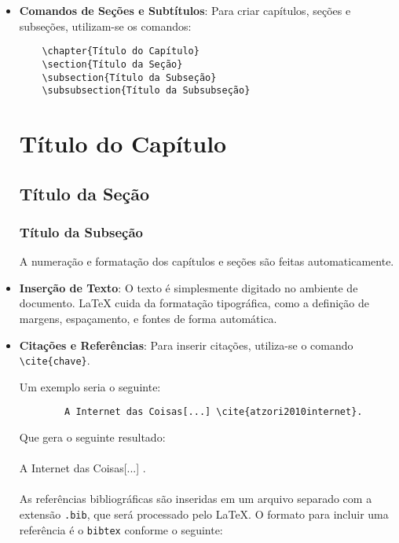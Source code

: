 \begin{itemize}

    \item \textbf{Comandos de Seções e Subtítulos}: Para criar capítulos, seções e subseções, utilizam-se os comandos:
    \begin{verbatim}
    \chapter{Título do Capítulo}
    \section{Título da Seção}
    \subsection{Título da Subseção}
    \subsubsection{Título da Subsubseção}
    \end{verbatim}

    \chapter{Título do Capítulo}
    \section{Título da Seção}
    \subsection{Título da Subseção}

    A numeração e formatação dos capítulos e seções são feitas automaticamente.

    \item \textbf{Inserção de Texto}: O texto é simplesmente digitado no ambiente de documento. LaTeX cuida da formatação tipográfica, como a definição de margens, espaçamento, e fontes de forma automática.

    \item \textbf{Citações e Referências}: Para inserir citações, utiliza-se o comando \texttt{\textbackslash cite\{chave\}}.

    Um exemplo seria o seguinte:

    \begin{verbatim}
        A Internet das Coisas[...] \cite{atzori2010internet}.
    \end{verbatim}
    Que gera o seguinte resultado:
\\\\
    \hspace{1cm}A Internet das Coisas[...] \cite{atzori2010internet}.
\\  \\  
    As referências bibliográficas são inseridas em um arquivo separado com a extensão \texttt{.bib}, que será processado pelo LaTeX. O formato para incluir uma referência é o \texttt{bibtex} conforme o seguinte:


\end{itemize}
